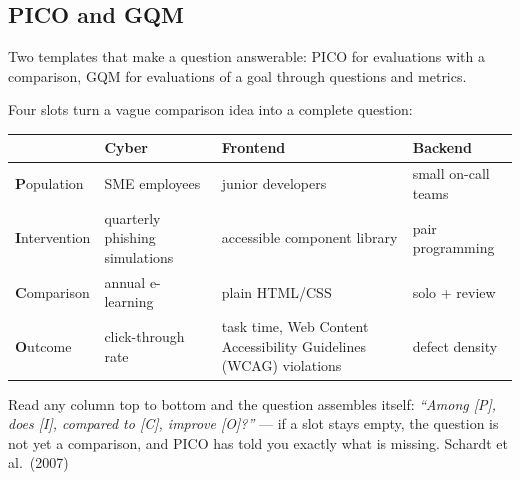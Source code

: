 \documentclass[11pt,a4paper,british,twoside=false,headings=small,chapterprefix=false,numbers=noenddot]{scrbook}
\begin{document}
\subsection{PICO and GQM}
Two templates that make a question answerable: PICO for evaluations with a comparison, GQM for evaluations of a goal through questions and metrics.
\begin{center}\small
\small Four slots turn a vague comparison idea into a complete question:
  
  \footnotesize
  \renewcommand{\arraystretch}{1.3}
  \begin{tabular}{@{}p{2.8cm}p{3.3cm}p{3.3cm}p{3.3cm}@{}}
    \toprule
    & \textbf{Cyber} & \textbf{Frontend} & \textbf{Backend}\\
    \midrule
    \textbf{P}opulation & SME employees & junior developers & small on-call teams\\
    \textbf{I}ntervention & quarterly phishing simulations & accessible component library & pair programming\\
    \textbf{C}omparison & annual e-learning & plain HTML/CSS & solo + review\\
    \textbf{O}utcome & click-through rate & task time, Web Content Accessibility Guidelines (WCAG) violations & defect density\\
    \bottomrule
  \end{tabular}
  

  Read any column top to bottom and the question assembles itself:
  \emph{``Among [P], does [I], compared to [C], improve [O]?''} --- if a slot
  stays empty, the question is not yet a comparison, and PICO has told you
  exactly what is missing.
  \hfill {\color{kgrey}\scriptsize Schardt et al.\ (2007)}
\end{center}
\end{document}
